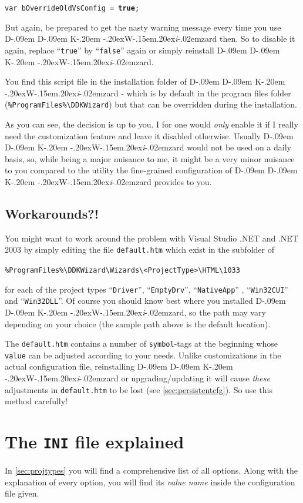 \documentclass[a4paper,titlepage]{report}
\def\ddkwiz{\texorpdfstring{D\kern-.09em D\kern-.09em K\kern-.20em \raise-.20ex\hbox{W}\kern-.15em\raise.20ex\hbox{\it{i}}\kern-.02em{zard}}{DDKWizard}}
\begin{document}
\texttt{var bOverrideOldVsConfig = \textbf{true};}

But again, be prepared to get the nasty warning message every time you use \ddkwiz{}
then. So to disable it again, replace ``\texttt{true}'' by ``\texttt{false}'' again
or simply reinstall \ddkwiz{}.

You find this script file in the installation folder of \ddkwiz{} - which is by
default in the program files folder
(\verb+%ProgramFiles%\DDKWizard+) but that can be overridden during the installation.

As you can see, the decision is up to you. I for one would \emph{only} enable it if
I really need the customization feature and leave it disabled otherwise. Usually
\ddkwiz{} would not be used on a daily basis, so, while being a major nuisance
to me, it might be a very minor nuisance to you compared to the utility the
fine-grained configuration of \ddkwiz{} provides to you.

\subsection{Workarounds?!}
You might want to work around the problem with Visual Studio .NET and .NET 2003
by simply editing the file \texttt{default.htm} which exist in the subfolder of

\verb+%ProgramFiles%\DDKWizard\Wizards\<ProjectType>\HTML\1033+

for each of the
project types ``\texttt{Driver}'', ``\texttt{EmptyDrv}'', ``\texttt{NativeApp}''
, ``\texttt{Win32CUI}'' and ``\texttt{Win32DLL}''. Of course you should know best where you installed
\ddkwiz{}, so the path may vary depending on your choice (the sample path above
is the default location).

The \texttt{default.htm} contains a number of \texttt{symbol}-tags at the beginning
whose \texttt{value} can be adjusted according to your needs. Unlike customizations
in the actual configuration file, reinstalling \ddkwiz{} or
upgrading/updating it will cause \emph{these} adjustments in \texttt{default.htm}
to be lost (see \autoref{sec:persistentcfg}). So use this method carefully!

\section{The \texttt{INI} file explained}
In \autoref{sec:projtypes} you will find a comprehensive list of all options.
Along with the explanation of every option, you will find its \emph{value name} inside the
configuration file given.
\end{document}
